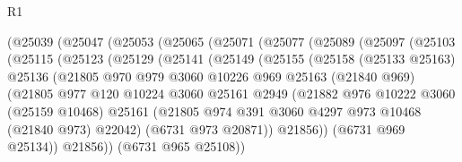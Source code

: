 \begin{lexlean}{R1}
\begin{coremodule}
            (@25039
              (@25047
                (@25053
                  (@25065
                    (@25071
                      (@25077
                        (@25089
                          (@25097
                            (@25103
                              (@25115
                                (@25123
                                  (@25129
                                    (@25141
                                      (@25149
                                        (@25155
                                          (@25158
                                            (@25133 @25163)
                                            @25136
                                            (@21805
                                              @970
                                              @979
                                              @3060
                                              @10226
                                              @969
                                              @25163
                                              (@21840 @969)
                                              (@21805
                                                @977
                                                @120
                                                @10224
                                                @3060
                                                @25161
                                                @2949
                                                (@21882
                                                  @976
                                                  @10222
                                                  @3060
                                                  (@25159 @10468)
                                                  @25161
                                                  (@21805
                                                    @974
                                                    @391
                                                    @3060
                                                    @4297
                                                    @973
                                                    @10468
                                                    (@21840 @973)
                                                    @22042)
                                                  (@6731 @973 @20871))
                                                @21856))
                                            (@6731 @969 @25134))
                                          @21856))
                                      (@6731 @965 @25108))

\end{coremodule}
\end{lexlean}
